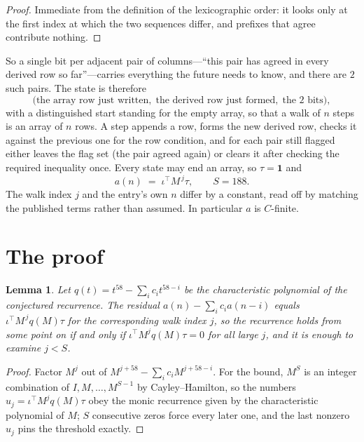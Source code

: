 \documentclass[11pt,a4paper]{article}
\theoremstyle{plain}
\newtheorem{lemma}[theorem]{Lemma}
\theoremstyle{definition}
\begin{document}
\begin{proof}
Immediate from the definition of the lexicographic order: it looks only at the first index at
which the two sequences differ, and prefixes that agree contribute nothing.
\end{proof}

So a single bit per adjacent pair of columns---``this pair has agreed in every derived row so
far''---carries everything the future needs to know, and there are $2$ such pairs. The state
is therefore
\[
\bigl(\text{the array row just written},\; \text{the derived row just formed},\;
\text{the 2 bits}\bigr),
\]
with a distinguished start standing for the empty array, so that a walk of $n$ steps is an array
of $n$ rows. A step appends a row, forms the new derived row, checks it against the previous one
for the row condition, and for each pair still flagged either leaves the flag set (the pair
agreed again) or clears it after checking the required inequality once. Every state may end an
array, so $\tau=\mathbf{1}$ and
\[
a(n)\;=\;\iota^{\!\top}M^{\,j}\tau ,\qquad S=188.
\]
The walk index $j$ and the entry's own $n$ differ by a constant, read off by matching the
published terms rather than assumed. In particular $a$ is $C$-finite.

\section{The proof}

\begin{lemma}\label{lem:crit}
Let $q(t)=t^{58}-\sum_i c_it^{58-i}$ be the characteristic polynomial of the
conjectured recurrence. The residual $a(n)-\sum_ic_ia(n-i)$ equals
$\iota^{\!\top}M^{\,j}q(M)\tau$ for the corresponding walk index $j$, so the recurrence
holds from some point on if and only if $\iota^{\!\top}M^{j}q(M)\tau=0$ for all large $j$,
and it is enough to examine $j<S$.
\end{lemma}

\begin{proof}
Factor $M^{j}$ out of $M^{j+58}-\sum_ic_iM^{j+58-i}$. For the bound, $M^{S}$
is an integer combination of $I,M,\dots,M^{S-1}$ by Cayley--Hamilton, so the numbers
$u_j=\iota^{\!\top}M^{j}q(M)\tau$ obey the monic recurrence given by the characteristic
polynomial of $M$; $S$ consecutive zeros force every later one, and the last nonzero $u_j$
pins the threshold exactly.
\end{proof}
\end{document}

